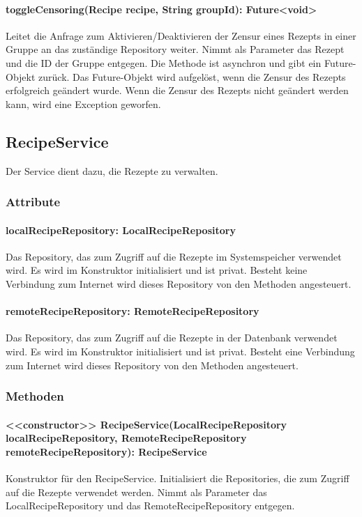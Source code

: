 \documentclass[parskip=full]{scrartcl}
\begin{document}
\paragraph{toggleCensoring(Recipe recipe, String groupId): Future<void>}
Leitet die Anfrage zum Aktivieren/Deaktivieren der Zensur eines Rezepts in einer Gruppe an das zuständige Repository weiter. Nimmt als Parameter das Rezept und die ID der Gruppe entgegen. Die Methode ist asynchron und gibt ein Future-Objekt zurück. Das Future-Objekt wird aufgelöst, wenn die Zensur des Rezepts erfolgreich geändert wurde. Wenn die Zensur des Rezepts nicht geändert werden kann, wird eine Exception geworfen.

\newpage
\subsection{RecipeService}
Der Service dient dazu, die Rezepte zu verwalten.
\subsubsection*{Attribute}
\paragraph{localRecipeRepository: LocalRecipeRepository}
Das Repository, das zum Zugriff auf die Rezepte im Systemspeicher verwendet wird. Es wird im Konstruktor initialisiert und ist privat. Besteht keine Verbindung zum Internet wird dieses Repository von den Methoden angesteuert.
\paragraph{remoteRecipeRepository: RemoteRecipeRepository}
Das Repository, das zum Zugriff auf die Rezepte in der Datenbank verwendet wird. Es wird im Konstruktor initialisiert und ist privat. Besteht eine Verbindung zum Internet wird dieses Repository von den Methoden angesteuert.
\subsubsection*{Methoden}
\paragraph{<<constructor>> RecipeService(LocalRecipeRepository localRecipeRepository, RemoteRecipeRepository remoteRecipeRepository): RecipeService}
Konstruktor für den RecipeService. Initialisiert die Repositories, die zum Zugriff auf die Rezepte verwendet werden. Nimmt als Parameter das LocalRecipeRepository und das RemoteRecipeRepository entgegen.
\end{document}
